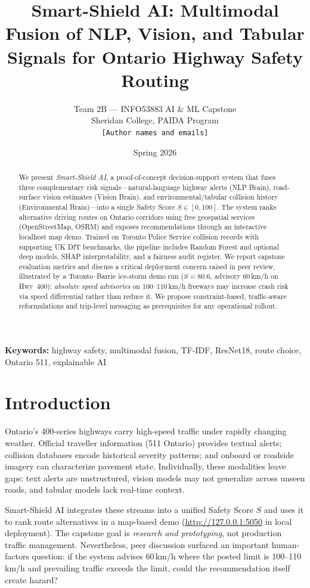 \documentclass[11pt,a4paper]{article}
\title{\textbf{Smart-Shield AI: Multimodal Fusion of NLP, Vision, and Tabular Signals for Ontario Highway Safety Routing}}
\author{
  Team 2B --- INFO53883 AI \& ML Capstone\\
  Sheridan College, PAIDA Program\\
  \texttt{[Author names and emails]}
}
\date{Spring 2026}
\begin{document}
\maketitle

\begin{abstract}
We present \emph{Smart-Shield AI}, a proof-of-concept decision-support system that fuses three complementary risk signals---natural-language highway alerts (NLP Brain), road-surface vision estimates (Vision Brain), and environmental/tabular collision history (Environmental Brain)---into a single Safety Score $S \in [0,100]$. The system ranks alternative driving routes on Ontario corridors using free geospatial services (OpenStreetMap, OSRM) and exposes recommendations through an interactive localhost map demo. Trained on Toronto Police Service collision records with supporting UK DfT benchmarks, the pipeline includes Random Forest and optional deep models, SHAP interpretability, and a fairness audit register. We report capstone evaluation metrics and discuss a critical deployment concern raised in peer review, illustrated by a Toronto--Barrie ice-storm demo run ($S=80.6$, advisory 60\,km/h on Hwy~400): \emph{absolute speed advisories} on 100--110\,km/h freeways may increase crash risk via speed differential rather than reduce it. We propose constraint-based, traffic-aware reformulations and trip-level messaging as prerequisites for any operational rollout.
\end{abstract}

\noindent\textbf{Keywords:} highway safety, multimodal fusion, TF-IDF, ResNet18, route choice, Ontario 511, explainable AI

\section{Introduction}
\label{sec:intro}

Ontario's 400-series highways carry high-speed traffic under rapidly changing weather. Official traveller information (511 Ontario) provides textual alerts; collision databases encode historical severity patterns; and onboard or roadside imagery can characterize pavement state. Individually, these modalities leave gaps: text alerts are unstructured, vision models may not generalize across unseen roads, and tabular models lack real-time context.

Smart-Shield AI integrates these streams into a unified Safety Score $S$ and uses it to rank route alternatives in a map-based demo (\url{http://127.0.0.1:5050} in local deployment). The capstone goal is \emph{research and prototyping}, not production traffic management. Nevertheless, peer discussion surfaced an important human-factors question: if the system advises 60\,km/h where the posted limit is 100--110\,km/h and prevailing traffic exceeds the limit, could the recommendation itself create hazard?
\end{document}
